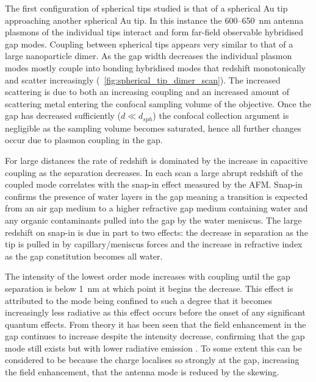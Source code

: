 \documentclass[a4paper]{article}
\begin{document}
The first configuration of spherical tips studied is that of a spherical Au tip approaching another spherical Au tip. In this instance the 600--\SI{650}{nm} antenna plasmons of the individual tips interact and form far-field observable hybridised gap modes. Coupling between spherical tips appears very similar to that of a large nanoparticle dimer. As the gap width decreases the individual plasmon modes mostly couple into bonding hybridised modes that redshift monotonically and scatter increasingly (\figurename~\ref{fig:spherical_tip_dimer_scan}). The increased scattering is due to both an increasing coupling and an increased amount of scattering metal entering the {\color{red}confocal sampling volume of the objective}. Once the gap has decreased sufficiently ($d \ll d_{sph}$) the confocal collection argument is negligible as the sampling volume becomes saturated, hence all further changes occur due to plasmon coupling in the gap.

For large distances the rate of redshift is dominated by the increase in capacitive coupling as the separation decreases. In each scan a large abrupt redshift of the coupled mode correlates with the snap-in effect measured by the AFM. Snap-in confirms the presence of water layers in the gap meaning a transition is expected from an air gap medium to a higher refractive gap medium containing water and any organic contaminants pulled into the gap by the water meniscus. The large redshift on snap-in is due in part to two effects: the decrease in separation as the tip is pulled in by {\color{red}capillary/meniscus} forces and the increase in refractive index as the gap constitution becomes all water.

The intensity of the lowest order mode increases with coupling until the gap separation is below \SI{1}{nm} at which point it begins the decrease. This effect is attributed to the mode being confined to such a degree that it becomes increasingly less radiative as this effect occurs before the onset of any significant quantum effects. From theory it has been seen that the field enhancement in the gap continues to increase despite the intensity decrease, confirming that the gap mode still exists but with lower radiative emission \cite{esteban2012}. To some extent this can be considered to be because the charge localises so strongly at the gap, increasing the field enhancement, that the antenna mode is reduced by the skewing.
\end{document}
